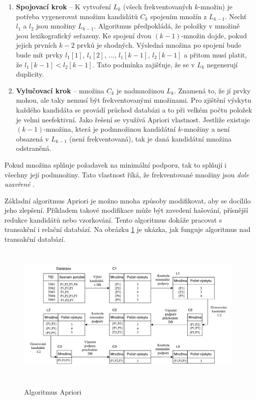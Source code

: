 \begin{enumerate}
    \item \textbf{Spojovací krok} -- K vytvoření $L_k$ (všech frekventovaných $k$-množin) je potřeba vygenerovat množinu kandidátů $C_k$ spojením množín z $L_{k-1}$. Nechť $l_1$ a $l_2$ jsou množiny $L_{k-1}$. Algoritmus předpokládá, že položky v množině jsou lexikografický seřazeny. Ke spojení dvou $(k-1)$-množin dojde, pokud jejich prvních $k-2$ prvků je shodných. Výsledná množina po spojení bude bude mít prvky $l_1[1]$, $l_1[2]$, ..., $l_1[k-1]$, $l_2[k-1]$ a přitom musí platit, že $l_1[k-1] < l_2[k-1]$. Tato podmínka zajišťuje, že se  v $L_k$ negenerují duplicity.
    \item \textbf{Vylučovací krok} -- množina $C_k$ je nadmnožinou $L_k$. Znamená to, že jí prvky mohou, ale taky nemusí být frekventovanými množinami. Pro zjištění výskytu každého kandidáta se provádí průchod databázi a to při velkém počtu položek je velmi neefektivní. Jako řešení se využívá Apriori vlastnost. Jestliže existuje $(k-1)$-množina, která je podmnožinou kandidátní $k$-množiny a není obsazená v $L_{k-1}$ (není frekventovaná), tak je daná kandidátní množina odstraněná.
\end{enumerate}

Pokud množina splňuje požadavek na minimální podporu, tak to splňují i všechny její podmnožiny. Tato vlastnost říká, že frekventované množiny jsou \textit{dole uzavřené} \cite{Dunham}.

Základní algoritmus Apriori je možno mnoha způsoby modifikovat, aby se docílilo jeho zlepšení. Příkladem takové modifikace může být zavedení hašování, přísnější redukce kandidátů nebo vzorkování. Tento algoritmus dokáže pracovat s transakční i relační databází. \cite{Han}
Na obrázku \ref{apriori} je ukázka, jak funguje algoritmus nad transakční databází.

\begin{figure}[h]\centering
  \centering
  \includegraphics[width=\linewidth,height=2.7in]{obrazky/apriori_alg.pdf}\\[1pt]
  \caption{Algoritmus Apriori}
  \label{apriori}
\end{figure}

